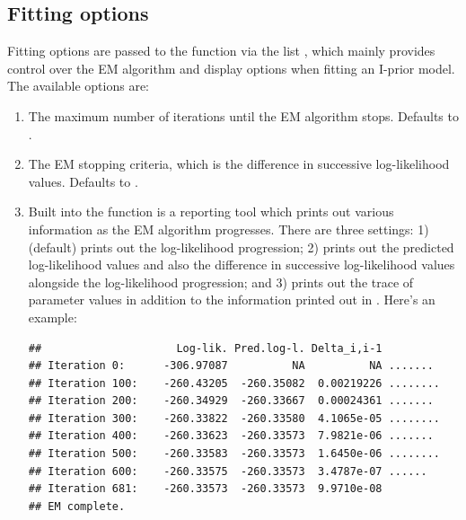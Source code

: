 \subsection{Fitting options}

Fitting options are passed to the  function via the list , which mainly provides control over the EM algorithm and display options when fitting an I-prior model. The available options are:

\begin{enumerate}

\item {}

The maximum number of iterations until the EM algorithm stops. Defaults to .

\item {}

The EM stopping criteria, which is the difference in successive log-likelihood values. Defaults to .

\item {}

Built into the  function is a reporting tool which prints out various information as the EM algorithm progresses. There are three settings: 1)  (default) prints out the log-likelihood progression; 2)  prints out the predicted log-likelihood values and also the difference in successive log-likelihood values alongside the log-likelihood progression; and 3)  prints out the trace of parameter values in addition to the information printed out in . Here's an example:

\begin{knitrout}
\color{fgcolor}\begin{kframe}
\begin{alltt}
 \hlkwb{<-}  \hlopt{~}   
                   \hlstd{=} \hlstd{(} \hlstd{=} \hlstd{))}
\end{alltt}
\begin{verbatim}
##                     Log-lik. Pred.log-l. Delta_i,i-1 
## Iteration 0:      -306.97087          NA          NA .......
## Iteration 100:    -260.43205  -260.35082  0.00219226 ........
## Iteration 200:    -260.34929  -260.33667  0.00024361 .......
## Iteration 300:    -260.33822  -260.33580  4.1065e-05 ........
## Iteration 400:    -260.33623  -260.33573  7.9821e-06 .......
## Iteration 500:    -260.33583  -260.33573  1.6450e-06 ........
## Iteration 600:    -260.33575  -260.33573  3.4787e-07 ......
## Iteration 681:    -260.33573  -260.33573  9.9710e-08 
## EM complete.
\end{verbatim}
\end{kframe}
\end{knitrout}


\end{enumerate}
